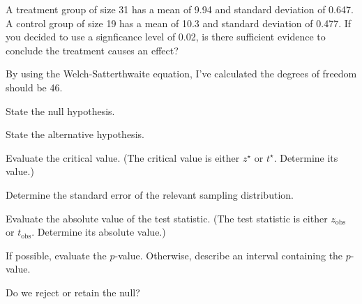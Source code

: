 
\begin{question}
A treatment group of size 31 has a mean of 9.94 and standard deviation
of 0.647. A control group of size 19 has a mean of 10.3 and standard
deviation of 0.477. If you decided to use a signficance level of 0.02,
is there sufficient evidence to conclude the treatment causes an effect?

By using the Welch-Satterthwaite equation, I've calculated the degrees
of freedom should be 46.
\begin{answerlist}
  \item State the null hypothesis.
  \item State the alternative hypothesis.
  \item Evaluate the critical value. (The critical value is either \(z^\star\)
or \(t^\star\). Determine its value.)
  \item Determine the standard error of the relevant sampling distribution.
  \item Evaluate the absolute value of the test statistic. (The test statistic
is either \(z_\text{obs}\) or \(t_\text{obs}\). Determine its absolute
value.)
  \item If possible, evaluate the \(p\)-value. Otherwise, describe an interval
containing the \(p\)-value.
  \item Do we reject or retain the null?
\end{answerlist}
\end{question}

